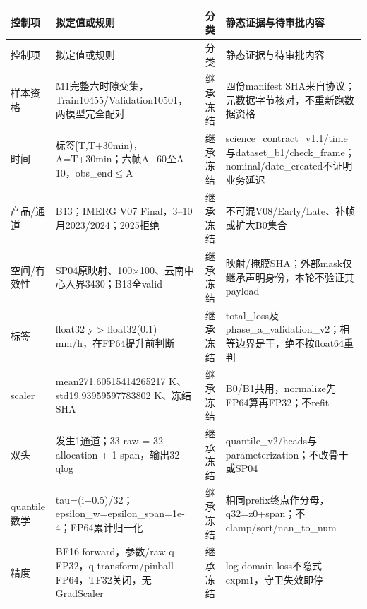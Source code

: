 \documentclass[UTF8,fontset=fandol,10pt]{ctexart}
\begin{document}
\begingroup\small\setlength{\tabcolsep}{3pt}\renewcommand{\arraystretch}{1.12}
\begin{longtable}{>{\raggedright\arraybackslash}p{\dimexpr(\linewidth-8\tabcolsep)/4\relax}>{\raggedright\arraybackslash}p{\dimexpr(\linewidth-8\tabcolsep)/4\relax}>{\raggedright\arraybackslash}p{\dimexpr(\linewidth-8\tabcolsep)/4\relax}>{\raggedright\arraybackslash}p{\dimexpr(\linewidth-8\tabcolsep)/4\relax}}
\toprule
控制项 & 拟定值或规则 & 分类 & 静态证据与待审批内容 \\
\midrule\endfirsthead
控制项 & 拟定值或规则 & 分类 & 静态证据与待审批内容 \\
\midrule\endhead
样本资格 & M1完整六时隙交集，Train10455/\allowbreak{}Validation10501，两模型完全配对 & 继承冻结 & 四份manifest SHA来自协议；元数据字节核对，不重新跑数据资格 \\
时间 & 标签[T,T+30min)，A=T+30min；六帧A\(-\)60至A\(-\)10，obs\_\allowbreak{}end\(\le\)A & 继承冻结 & science\_\allowbreak{}contract\_\allowbreak{}v1.1/\allowbreak{}time与dataset\_\allowbreak{}b1/\allowbreak{}check\_\allowbreak{}frame；nominal/\allowbreak{}date\_\allowbreak{}created不证明业务延迟 \\
产品/\allowbreak{}通道 & B13；IMERG V07 Final，3–10月2023/\allowbreak{}2024；2025拒绝 & 继承冻结 & 不可混V08/\allowbreak{}Early/\allowbreak{}Late、补帧或扩大B0集合 \\
空间/\allowbreak{}有效性 & SP04原映射、100\(\times\)100、云南中心入界3430；B13全valid & 继承冻结 & 映射/\allowbreak{}掩膜SHA；外部mask仅继承声明身份，本轮不验证其payload \\
标签 & float32 y > float32(0.1) mm/\allowbreak{}h，在FP64提升前判断 & 继承冻结 & total\_\allowbreak{}loss及phase\_\allowbreak{}a\_\allowbreak{}validation\_\allowbreak{}v2；相等边界是干，绝不按float64重判 \\
scaler & mean271.60515414265217 K、std19.93959597783802 K、冻结SHA & 继承冻结 & B0/\allowbreak{}B1共用，normalize先FP64算再FP32；不refit \\
双头 & 发生1通道；33 raw = 32 allocation + 1 span，输出32 qlog & 继承冻结 & quantile\_\allowbreak{}v2/\allowbreak{}heads与parameterization；不改骨干或SP04 \\
quantile数学 & tau=(i\(-\)0.5)/\allowbreak{}32；epsilon\_\allowbreak{}w=epsilon\_\allowbreak{}span=1e-4；FP64累计归一化 & 继承冻结 & 相同prefix终点作分母，q32=z0+span；不clamp/\allowbreak{}sort/\allowbreak{}nan\_\allowbreak{}to\_\allowbreak{}num \\
精度 & BF16 forward，参数/\allowbreak{}raw q FP32，q transform/\allowbreak{}pinball FP64，TF32关闭，无GradScaler & 继承冻结 & log-domain loss不隐式expm1，守卫失效即停 \\

\end{longtable}
\end{document}
